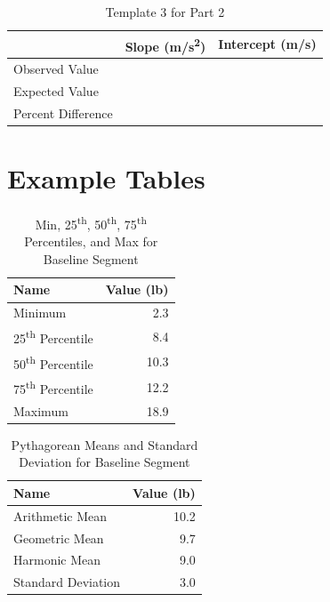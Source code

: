 %
\begin{table}[ht!]
    \begin{center}
        \begin{tabular}{l | l | l}
            & \textbf{Slope} (m/s\textsuperscript{2}) & \textbf{Intercept} (m/s) \\
            \hline
            Observed Value & & \\
            Expected Value & & \\
            \hline
            Percent Difference & & \\
            \hline
        \end{tabular}
    \end{center}
    \caption{Template 3 for Part 2}
    \label{table.00.template.3}
\end{table}
%
\newpage
\section{Example Tables}
%
\begin{table}[ht]
    \centering
    \begin{tabular}{l|r}
        \textbf{Name} & \textbf{Value} (lb) \\
        \hline
		Minimum & 2.3 \\
		25\textsuperscript{th} Percentile & 8.4 \\
		50\textsuperscript{th} Percentile & 10.3 \\
		75\textsuperscript{th} Percentile & 12.2 \\
		Maximum & 18.9 \\
		\hline
	\end{tabular}
    \caption{Min, 25\textsuperscript{th}, 50\textsuperscript{th}, 75\textsuperscript{th} Percentiles, and Max for Baseline Segment}
    \label{table:00.baseline.descriptive}
\end{table}
%
\begin{table}[ht]
    \centering
    \begin{tabular}{l|r}
		\textbf{Name} & \textbf{Value} (lb) \\
        \hline
		Arithmetic Mean & 10.2 \\
		Geometric Mean & 9.7 \\
        Harmonic Mean & 9.0 \\
        \hline
        Standard Deviation & 3.0 \\
		\hline
	\end{tabular}
    \caption{Pythagorean Means and Standard Deviation for Baseline Segment}
    \label{table:00.baseline.means}
\end{table}
